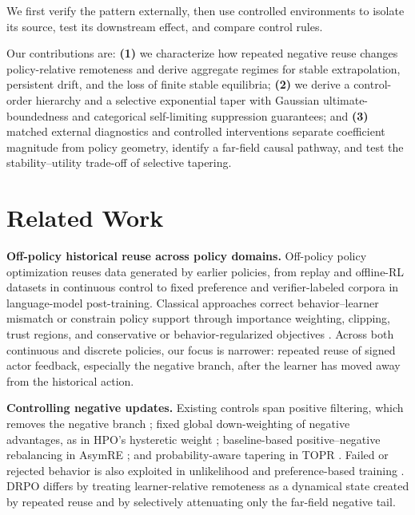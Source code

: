 \documentclass{article}
\theoremstyle{plain}
\theoremstyle{definition}
\theoremstyle{remark}
\begin{document}
We first verify the pattern externally, then use controlled environments to
isolate its source, test its downstream effect, and compare control rules.

Our contributions are: \textbf{(1)} we characterize how repeated negative
reuse changes policy-relative remoteness and derive aggregate regimes for
stable extrapolation, persistent drift, and the loss of finite stable
equilibria; \textbf{(2)} we derive a control-order hierarchy and a selective
exponential taper with Gaussian ultimate-boundedness and categorical
self-limiting suppression guarantees; and \textbf{(3)} matched external
diagnostics and controlled interventions separate coefficient magnitude
from policy geometry, identify a far-field causal pathway, and test the
stability--utility trade-off of selective tapering.


\section{Related Work}
\label{sec:related_work}

\textbf{Off-policy historical reuse across policy domains.}
Off-policy policy optimization reuses data generated by earlier policies,
from replay and offline-RL datasets in continuous control to fixed
preference and verifier-labeled corpora in language-model post-training.
Classical approaches correct behavior--learner mismatch or constrain policy
support through importance weighting, clipping, trust regions, and
conservative or behavior-regularized objectives
\citep{precup2000eligibility,munos2016safe,schulman2015trust,
schulman2017proximal,fujimoto2019off,kumar2020conservative,
fujimoto2021minimalist,kostrikov2021offline}. Across both continuous and
discrete policies, our focus is narrower: repeated reuse of signed actor
feedback, especially the negative branch, after the learner has moved away
from the historical action.

\textbf{Controlling negative updates.}
Existing controls span positive filtering, which removes the negative branch
\citep{peng2019advantage,nair2020awac,kostrikov2021offline}; fixed global
down-weighting of negative advantages, as in HPO's hysteretic weight
\citep{sana2026hpo}; baseline-based positive--negative rebalancing in
AsymRE \citep{arnal2025asymmetric}; and probability-aware tapering in TOPR
\citep{leroux2025tapered}. Failed or rejected behavior is also exploited in
unlikelihood and preference-based training
\citep{welleck2019neural,rafailov2023direct,ethayarajh2024kto,
duan2024negating,zhang2024negative,zhu2025negative,song2025good}.
DRPO differs by treating learner-relative remoteness as a dynamical state
created by repeated reuse and by selectively attenuating only the far-field
negative tail.
\end{document}
